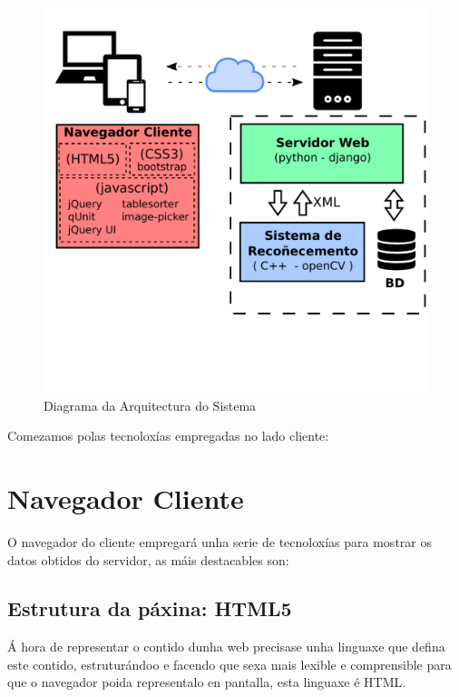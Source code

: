     \begin{figure}[htp]
    \begin{center}
        \includegraphics[scale=0.6]{figures/ArqSistemaCustom.pdf}
        \caption{Diagrama da Arquitectura do Sistema}
    \label{fig:ArqSistemaCustom}
    \end{center}
    \end{figure}
    
    Comezamos polas tecnoloxías empregadas no lado cliente:
    \section{Navegador Cliente}
    
    O navegador do cliente empregará unha serie de tecnoloxías para mostrar os datos obtidos do 
    servidor, as máis destacables son:
    
    \subsection{Estrutura da páxina: HTML5}
        Á hora de representar o contido dunha web precisase unha linguaxe que defina este contido,
        estruturándoo e facendo que sexa mais lexible e comprensible para que o navegador poida 
        representalo en pantalla, esta linguaxe é HTML.
        
